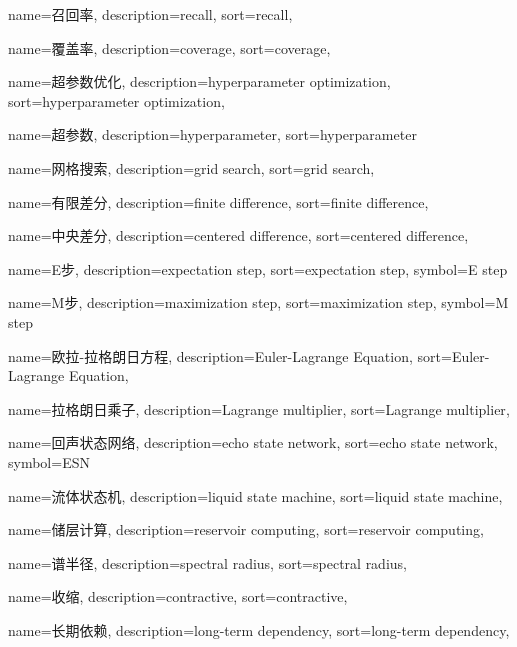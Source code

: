 {
  name=召回率,
  description={recall},
  sort={recall},
}

{
  name=覆盖率,
  description={coverage},
  sort={coverage},
}

{
  name=超参数优化,
  description={hyperparameter optimization},
  sort={hyperparameter optimization},
}

{
  name=超参数,
  description={hyperparameter},
  sort={hyperparameter}
}

{
  name=网格搜索,
  description={grid search},
  sort={grid search},
}

{
  name=有限差分,
  description={finite difference},
  sort={finite difference},
}

{
  name=中央差分,
  description={centered difference},
  sort={centered difference},
}

{
  name=E步,
  description={expectation step},
  sort={expectation step},
  symbol={E step}
}

{
  name=M步,
  description={maximization step},
  sort={maximization step},
  symbol={M step}
}

{
  name=欧拉-拉格朗日方程,
  description={Euler-Lagrange Equation},
  sort={Euler-Lagrange Equation},
}


{
	name=拉格朗日乘子,
	description={Lagrange multiplier},
	sort={Lagrange multiplier},
}

{
  name=回声状态网络,
  description={echo state network},
  sort={echo state network},
  symbol={ESN}
}

{
  name=流体状态机,
  description={liquid state machine},
  sort={liquid state machine},
}

{
  name=储层计算,
  description={reservoir computing},
  sort={reservoir computing},
}

{
  name=谱半径,
  description={spectral radius},
  sort={spectral radius},
}

{
  name=收缩,
  description={contractive},
  sort={contractive},
}

{
  name=长期依赖,
  description={long-term dependency},
  sort={long-term dependency},
}

